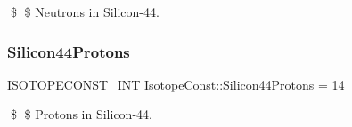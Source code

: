 \$ \$ Neutrons in Silicon-\/44. \mbox{\label{group___isotope_const-_silicon-_si44_ga4f6b97532e4cdbb7952a524ff23ab089}} 
\subsubsection{\texorpdfstring{Silicon44\+Protons}{Silicon44Protons}}
{\footnotesize\ttfamily \mbox{\hyperlink{group___isotope_const-_macros_ga5f18360b3e99483a35c32d789e62621c}{I\+S\+O\+T\+O\+P\+E\+C\+O\+N\+S\+T\+\_\+\+I\+NT}} Isotope\+Const\+::\+Silicon44\+Protons = 14}

\$ \$ Protons in Silicon-\/44. 